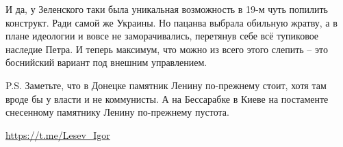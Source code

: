 И да, у Зеленского таки была уникальная возможность в 19-м чуть попилить
конструкт. Ради самой же Украины. Но пацанва выбрала обильную жратву, а в плане
идеологии и вовсе не заморачивались, перетянув себе всё тупиковое наследие
Петра. И теперь максимум, что можно из всего этого слепить – это боснийский
вариант под внешним управлением.

P.S. Заметьте, что в Донецке памятник Ленину по-прежнему стоит, хотя там вроде
бы у власти и не коммунисты. А на Бессарабке в Киеве на постаменте снесенному
памятнику Ленину по-прежнему пустота.

\url{https://t.me/Lesev_Igor}
